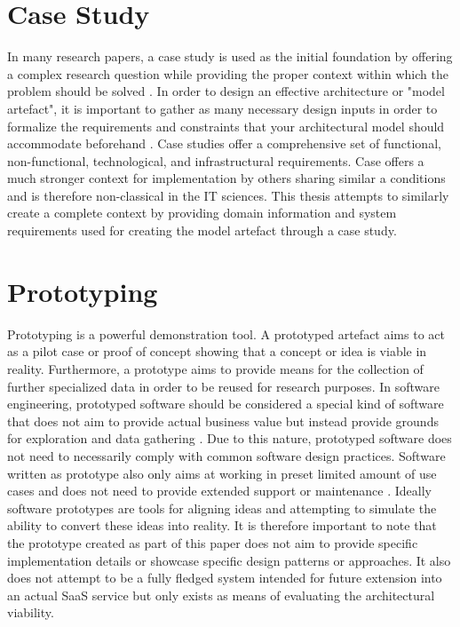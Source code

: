 \section{Case Study}

In many research papers, a case study is used as the initial foundation by offering a complex research question while providing the proper context within which the problem should be solved \cite{Schell1992-cm}. In order to design an effective architecture or "model artefact", it is important to gather as many necessary design inputs in order to formalize the requirements and constraints that your architectural model should accommodate beforehand \cite{Microsoft_Patterns_Practices_Team2009-ek}. Case studies offer a comprehensive set of functional, non-functional, technological, and infrastructural requirements.
Case offers a much stronger context for implementation by others sharing similar a conditions and is therefore non-classical in the IT sciences. This thesis attempts to similarly create a complete context by providing domain information and system requirements used for creating the model artefact through a case study.


\section{Prototyping}

Prototyping is a powerful demonstration tool. A prototyped artefact aims to act as a pilot case or proof of concept showing that a concept or idea is viable in reality. Furthermore, a prototype aims to provide means for the collection of further specialized data in order to be reused for research purposes. In software engineering, prototyped software should be considered a special kind of software that does not aim to provide actual business value but instead provide grounds for exploration and data gathering \cite{Monperrus2013}. Due to this nature, prototyped software does not need to necessarily comply with common software design practices. Software written as prototype also only aims at working in preset limited amount of use cases and does not need to provide extended support or maintenance \cite{Monperrus2013}. Ideally software prototypes are tools for aligning ideas and attempting to simulate the ability to convert these ideas into reality. It is therefore important to note that the prototype created as part of this paper does not aim to provide specific implementation details or showcase specific design patterns or approaches. It also does not attempt to be a fully fledged system intended for future extension into an actual SaaS service but only exists as means of evaluating the architectural viability.


